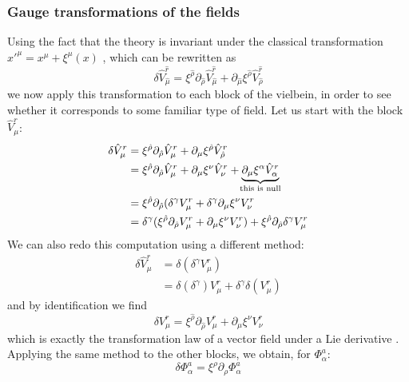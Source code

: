 \documentclass{article}
\begin{document}
\subsubsection{Gauge transformations of the fields} \label{subsubsec:4.3.1}
Using the fact that the theory is invariant under the classical transformation $x'^\mu = x^\mu + \xi^\mu(x)$ \cite{scherk1979get}, which can be rewritten as
 \begin{equation}
    \delta  \hat V^{\hat r}_{\hat \mu } = \xi^{\hat \rho}  \partial_{\hat \rho} \hat V^{\hat r}_{\hat \mu} + \partial_{\hat \mu} \xi^{\hat \rho} \hat V^{ \hat r}_{\hat \rho} 
 \end{equation}
we now apply this transformation to each block of the vielbein, in order to see whether it corresponds to some familiar type of field. Let us start with the block $\hat V^r_\mu$:
\begin{align*}
    \delta \hat V^r_\mu &=  \xi^{\hat \rho}  \partial_{\hat \rho} \hat V^{ r}_{ \mu} + \partial_{ \mu} \xi^{ \hat \rho} \hat V^{  r}_{\hat \rho} \\
   &=  \xi^{\hat \rho}  \partial_{\hat \rho} \hat V^{ r}_{ \mu} + \partial_{ \mu} \xi^{ \nu} \hat V^{  r}_{\nu} + \underbrace{\partial_{ \mu } \xi^{  \alpha } \hat V^{  r}_{ \alpha }}_{\mathclap{\text{this is null}}}\\
   &=  \xi^{\hat \rho}  \partial_{\hat \rho}(\delta^{\gamma} V^{ r}_{ \mu} +  \delta^{\gamma} \partial_{ \mu} \xi^{ \nu} V^{  r}_{\nu} \\
   &= \delta^{\gamma}(\xi^{\hat \rho}  \partial_{\hat \rho}V^{ r}_{ \mu} +  \partial_{ \mu} \xi^{ \nu} V^{  r}_{\nu} ) + \xi^{\hat \rho}  \partial_{\hat \rho}\delta^{\gamma} V^{ r}_{ \mu}
\end{align*}
We can also redo this computation using a different method:
\begin{align*}
    \delta \hat V^r_\mu &= \delta( \delta^\gamma V^r_\mu)\\
    & = \delta (\delta^\gamma) V^r_\mu + \delta^\gamma  \delta (V^r_\mu)
\end{align*}
and by identification we find
\begin{equation*}
    \delta V^r_\mu =  \xi^{\hat \rho}  \partial_{\hat \rho}V^{ r}_{ \mu} +  \partial_{ \mu} \xi^{ \nu} V^{  r}_{\nu} 
\end{equation*}
which is exactly the transformation law of a vector field under a Lie derivative \cite{freedman2012supergravity}. Applying the same method to the other blocks, we obtain, for $\Phi^a_\alpha$:
\begin{equation*}
    \delta \Phi^a_\alpha = \xi^\rho \partial_\rho \Phi^a_\alpha
\end{equation*}
\end{document}

